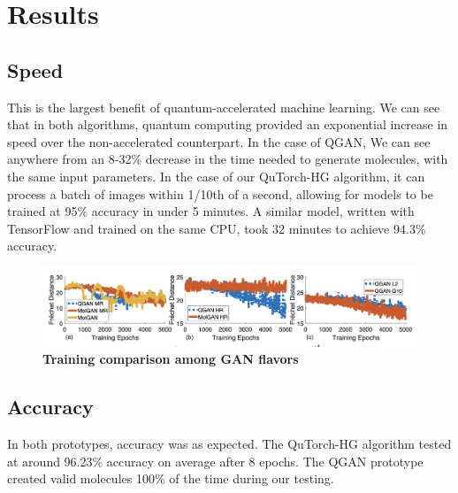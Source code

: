 \documentclass{scrartcl}
\begin{document}
\section{Results}
\label{sec:orge9f3984}

\subsection{Speed}
\label{sec:org5a6f58b}

This is the largest benefit of quantum-accelerated machine learning.  We can see that in both algorithms, quantum computing provided an exponential increase in speed over the non-accelerated counterpart. In the case of QGAN, We can see anywhere from an 8-32\% decrease in the time needed to generate molecules, with the same input parameters. In the case of our QuTorch-HG algorithm, it can process a batch of images within 1/10th of a second, allowing for models to be trained at 95\% accuracy in under 5 minutes. A similar model, written with TensorFlow and trained on the same CPU, took 32 minutes to achieve 94.3\% accuracy.

\begin{figure}[htbp]
\centering
\includegraphics[width=.9\linewidth]{./assets/quganresults.png}
\caption{\textbf{Training comparison among GAN flavors}}
\end{figure}

\subsection{Accuracy}
\label{sec:orgea680da}

In both prototypes, accuracy was as expected. The QuTorch-HG algorithm tested at around 96.23\% accuracy on average after 8 epochs. The QGAN prototype created valid molecules 100\% of the time during our testing.
\end{document}
